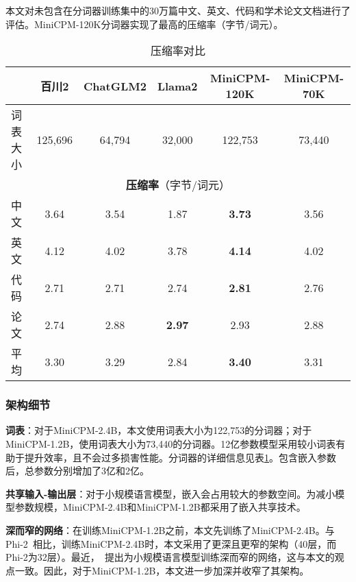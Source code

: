 本文对未包含在分词器训练集中的30万篇中文、英文、代码和学术论文文档进行了评估。MiniCPM-120K分词器实现了最高的压缩率（字节/词元）。

\begin{table}[htbp]
    \centering
    \caption{压缩率对比}
    \begin{tabular}{lccccc}
    \toprule
      & {\textbf{百川2}}  & {\textbf{ChatGLM2}} & {\textbf{Llama2}} & {\textbf{MiniCPM-120K}}  & {\textbf{MiniCPM-70K}}\\
    \midrule
    词表大小 & 125,696 & 64,794 & 32,000 & 122,753 & 73,440\\
    \midrule
    \multicolumn{6}{c}{\textbf{压缩率}（字节/词元） }\\
    \midrule
    中文 & 3.64   & 3.54  & 1.87  & \textbf{3.73} &  3.56 \\
    英文 & 4.12   & 4.02  & 3.78  & \textbf{4.14} & 4.02 \\
    代码    & 2.71   & 2.71  & 2.74  & \textbf{2.81} & 2.76 \\
    论文   & 2.74   & 2.88  & \textbf{2.97}  & 2.93 & 2.88\\
    \midrule
    平均 & 3.30   & 3.29  & 2.84  & \textbf{3.40}  & 3.31 \\
    \bottomrule
    \end{tabular}
    \label{tab:compression_ratio}
\end{table}
    


\subsubsection{架构细节}

\noindent\textbf{词表}：对于MiniCPM-2.4B，本文使用词表大小为122,753的分词器；对于MiniCPM-1.2B，使用词表大小为73,440的分词器。12亿参数模型采用较小词表有助于提升效率，且不会过多损害性能。分词器的详细信息见表\ref{tab:compression_ratio}。包含嵌入参数后，总参数分别增加了3亿和2亿。 

\noindent\textbf{共享输入-输出层}：对于小规模语言模型，嵌入会占用较大的参数空间。为减小模型参数规模，MiniCPM-2.4B和MiniCPM-1.2B都采用了嵌入共享技术。 

\noindent\textbf{深而窄的网络}：在训练MiniCPM-1.2B之前，本文先训练了MiniCPM-2.4B。与Phi-2~\citep{Javaheripi2023Phi2}相比，训练MiniCPM-2.4B时，本文采用了更深且更窄的架构（40层，而Phi-2为32层）。最近，~\cite{liu2024mobilellm}提出为小规模语言模型训练深而窄的网络，这与本文的观点一致。因此，对于MiniCPM-1.2B，本文进一步加深并收窄了其架构。 

